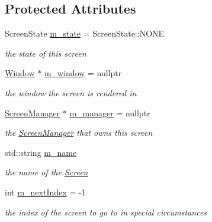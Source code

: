 \subsection*{Protected Attributes}
\begin{DoxyCompactItemize}
\item 
\mbox{\label{classnta_1_1Screen_a68d2c095aadfb248263f43cb12cd34a1}} 
Screen\+State \hyperlink{classnta_1_1Screen_a68d2c095aadfb248263f43cb12cd34a1}{m\+\_\+state} = Screen\+State\+::\+N\+O\+NE
\begin{DoxyCompactList}\small\item\em the state of this screen \end{DoxyCompactList}\item 
\mbox{\label{classnta_1_1Screen_a712bfbeb6f85d9c4229de9b974b05e58}} 
\hyperlink{classnta_1_1Window}{Window} $\ast$ \hyperlink{classnta_1_1Screen_a712bfbeb6f85d9c4229de9b974b05e58}{m\+\_\+window} = nullptr
\begin{DoxyCompactList}\small\item\em the window the screen is rendered in \end{DoxyCompactList}\item 
\mbox{\label{classnta_1_1Screen_a3496a69b02f4b120d907042d3201deff}} 
\hyperlink{classnta_1_1ScreenManager}{Screen\+Manager} $\ast$ \hyperlink{classnta_1_1Screen_a3496a69b02f4b120d907042d3201deff}{m\+\_\+manager} = nullptr
\begin{DoxyCompactList}\small\item\em the \hyperlink{classnta_1_1ScreenManager}{Screen\+Manager} that owns this screen \end{DoxyCompactList}\item 
\mbox{\label{classnta_1_1Screen_a309f2a837c5c8c42dc55206a5c63ab6a}} 
std\+::string \hyperlink{classnta_1_1Screen_a309f2a837c5c8c42dc55206a5c63ab6a}{m\+\_\+name}
\begin{DoxyCompactList}\small\item\em the name of the \hyperlink{classnta_1_1Screen}{Screen} \end{DoxyCompactList}\item 
\mbox{\label{classnta_1_1Screen_a6be3b899f3bc9e531d64676cbbd6815e}} 
int \hyperlink{classnta_1_1Screen_a6be3b899f3bc9e531d64676cbbd6815e}{m\+\_\+next\+Index} = -\/1
\begin{DoxyCompactList}\small\item\em the index of the screen to go to in special circumstances \end{DoxyCompactList}\end{DoxyCompactItemize}
